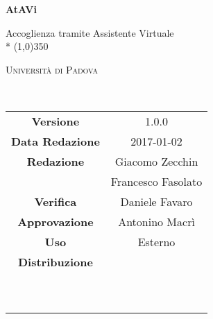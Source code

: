 \documentclass[a4paper,12pt]{article}
\author{Daniele Favaro, Marco Franceschini}
\date{2016-12-09}
\begin{document}
	\begin{titlepage}
		\centering
		{\huge\bfseries AtAVi\par}
		Accoglienza tramite Assistente Virtuale \\*
		\line(1,0){350} \\
		{\scshape\LARGE Università di Padova \par}
		\vspace{1cm}
		{\scshape\Large \pianodiqualificai\ \par}
		\logo
		\newpage
		\begin{tabular}{c|c}
			{\hfill \textbf{Versione}} 			& 1.0.0				\\
			{\hfill\textbf{Data Redazione}} 	& 2017-01-02 		\\
			{\hfill\textbf{Redazione}} 			& Giacomo Zecchin \\ & Francesco Fasolato \\
			{\hfill\textbf{Verifica}} 			& Daniele Favaro				\\
			{\hfill\textbf{Approvazione}} 			& Antonino Macrì				\\
			{\hfill\textbf{Uso}} 				& Esterno 					\\
			{\hfill\textbf{Distribuzione}} 		& \vardanega\ \\ & \cardin\ \\ & \prop\ \\
		\end{tabular}
	\end{titlepage}
	
	\pagestyle{myfront}
	\newpage
		
	
	\newpage
		\tableofcontents 	%
	\newpage
		\listoftables 		%
	
	\label{LastFrontPage}
	
	\newpage	
	\pagestyle{mymain}
				
	\newpage	
		
	\newpage	
			
	\newpage	
		
		
	\label{LastPage}
\end{document}
